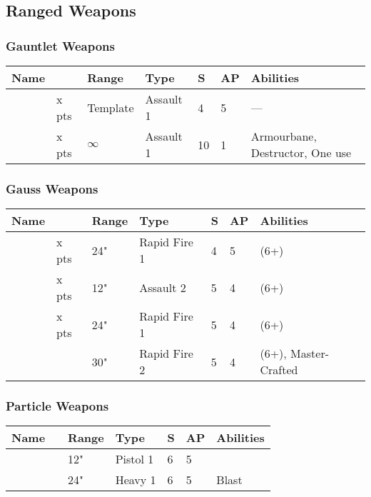 \subsection{Ranged Weapons} \label{Ranged Weapons}

\subsubsection{Gauntlet Weapons}

\label{Gauntlet of Fire} \label{Tachyon Arrow}
\noindent
\begin{tabular}{||m{110pt} m{30pt} m{31pt} m{55pt} m{12pt} m{12pt} m{210pt}||}
	\hline
	Name & & Range & Type & S & AP & Abilities \\
	\hline
	\quickref{Gauntlet of Fire} & x pts& Template & Assault 1 & 4 & 5 & — \\
	\quickref{Tachyon Arrow} & x pts& $\infty$ & Assault 1 & 10 & 1 & Armourbane, Destructor, One use \\
	\hline
\end{tabular}



\subsubsection{Gauss Weapons}

\label{Gauss Blaster} \label{Gauss Flayer} \label{Gauss Reaper} \label{Relic Gauss Blaster}
\noindent
\begin{tabular}{||m{110pt} m{30pt} m{31pt} m{55pt} m{12pt} m{12pt} m{210pt}||}
	\hline
	Name & & Range & Type & S & AP & Abilities \\
	\hline
	\quickref{Gauss Flayer} & x pts& 24" & Rapid Fire 1 & 4 & 5 & \quickref{Gauss} (6+) \\
	\quickref{Gauss Reaper} & x pts& 12" & Assault 2 & 5 & 4 & \quickref{Gauss} (6+) \\
	\quickref{Gauss Blaster} & x pts& 24" & Rapid Fire 1 & 5 & 4 & \quickref{Gauss} (6+) \\
	\quickref{Relic Gauss Blaster} & & 30" & Rapid Fire 2 & 5 & 4 & \quickref{Gauss} (6+), Master-Crafted \\	
	\hline
\end{tabular}

\subsubsection{Particle Weapons}

\label{Particle Caster} \label{Particle Beamer}
\noindent
\begin{tabular}{||m{110pt} m{30pt} m{31pt} m{55pt} m{12pt} m{12pt} m{210pt}||}
	\hline
	Name & & Range & Type & S & AP & Abilities \\
	\hline
	\quickref{Particle Caster} & & 12" & Pistol 1 & 6 & 5 & \\
	\quickref{Particle Beamer} & & 24" & Heavy 1 & 6 & 5 & Blast \\	
	\hline
\end{tabular}

